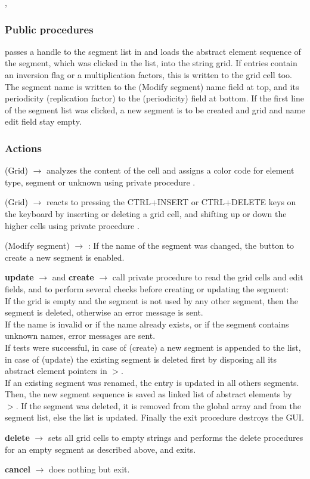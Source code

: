 \documentclass[12pt]{article}
\newcommand\code[1]{{\tt #1}}
\newcommand{\ofld}[1]{\colorbox{black!15}{{{\color{black}\bf #1}}}}
\newcommand{\ofldx}[1]{\colorbox{black!15}{{\color{black}(#1)}}}
\newcommand\guico[1]{{\color{blue}\code{#1}}}
\newcommand{\unico}[1]{{\color{burntorange}\code{#1}}}
\newcommand{\evcod}[2]{\ofld{#1} $\rightarrow$ \guico{#2}}
\newcommand{\evcodx}[2]{\ofldx{#1} $\rightarrow$ \guico{#2}}
\newcommand{\prcod}[2]{\opauni{#1}$>$\unico{#2}}
\newcommand{\opagui}[1]{\colorbox{blue!20}{{\color{black}\code{#1}}}}
\newcommand{\ogui}[1]{\hyperref[#1]{\opagui{#1}}}
\newcommand{\opauni}[1]{\colorbox{orange!30}{{\color{black}\code{#1}}}}
\newcommand{\ouni}[1]{\hyperref[#1]{\opauni{#1}}}
\newcommand{\uses}[1]{\flushleft {\bf Uses:} #1}
\newcommand{\act}[1]{\subsubsection*{Actions} #1}
\newcommand{\ppro}[1]{\subsubsection*{Public procedures} #1}
\begin{document}
\uses{\ouni{globlib}, \ouni{../com/asaux}}

\ppro{
\guico{Init} passes a handle to the segment list in \ogui{opaeditor} and loads the abstract element sequence of the segment, which was clicked in the list, into the string grid. If entries contain an inversion flag or a multiplication factors, this is written to the grid cell too. The segment name is written to the \ofldx{Modify segment} name field at top, and its periodicity (replication factor) to the \ofldx{periodicity} field at bottom. If the first line of the segment list was clicked, a new segment is to be created and grid and name edit field stay empty.
}
\act{
\evcodx{Grid}{drawCell} analyzes the content of the cell and assigns a color code for element type, segment or unknown using private procedure \guico{ElemCol\_C}.

\evcodx{Grid}{gridKeyDown} reacts to pressing the CTRL+INSERT or CTRL+DELETE keys on the keyboard by inserting or deleting a grid cell, and shifting up or down the higher cells using private procedure \guico{ShiftCells}.

\evcodx{Modify segment}{EditSegNameChange}: If the name of the segment was changed, the button to create a new segment is enabled.

\evcod{update}{butokClick} and \evcod{create}{butcreClick} call private procedure \guico{SaveSeg} to read the grid cells and edit fields, and to perform several checks before creating or updating the segment:\\
If the grid is empty and the segment is not used by any other segment, then the segment is deleted, otherwise an error message is sent.\\
If the name is invalid or if the name already exists, or if the  segment contains unknown names, error messages are sent.\\
If tests were successful, in case of \ofldx{create} a new segment is appended to the list, in case of \ofldx{update} the existing segment is deleted first by disposing all its abstract element pointers in \prcod{globlib}{ClearSeg}.\\
If an existing segment was renamed, the entry is updated in all others segments. Then, 
the new segment sequence is saved as linked list of abstract elements by \prcod{globlib}{AppendAE}. If the segment was deleted, it is removed from the global \unico{Segm} array and from the \ogui{opaeditor} segment list, else the list is updated. Finally the exit procedure destroys the GUI.

\evcod{delete}{butdelClick} sets all grid cells to empty strings and performs the delete procedures for an empty segment as described above, and exits.

\evcod{cancel}{butcanClick} does nothing but exit.
}
\end{document}
